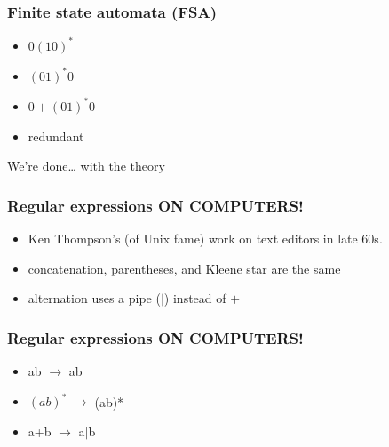 \documentclass[%
        hyperref={%
                pdfauthor={Zakariyya Mughal},%
                pdfpagemode={None},pdfpagelayout={SinglePage}}%
        xcolor={x11names},%
]{beamer}
\begin{document}
\begin{frame}
\frametitle{Finite state automata (FSA)}
\centering\resizebox{0.8\textwidth}{!}{ 
	
}

\begin{itemize}
	\item \(0(10)^*\)
		\pause
	\item \((01)^*0\)
		\pause
	\item \(0+(01)^*0\)
	\item[]	\quad redundant
\end{itemize}
\end{frame}

\begin{frame}
	\begin{center}
	\Huge
	We're done\ldots\newline
	\pause
	with the theory
	\end{center}
\end{frame}

\begin{frame}
	\frametitle{Regular expressions ON COMPUTERS!}
	\begin{itemize}
		\item Ken Thompson's (of Unix fame) work on text
			editors in late 60s.
		\item concatenation, parentheses, and Kleene star are the same
		\item alternation uses a pipe (\(|\)) instead of
			\(+\)
	\end{itemize}
\end{frame}

\begin{frame}
	\frametitle{Regular expressions ON COMPUTERS!}
	\begin{itemize}
		\item  ab \(\rightarrow\) ab
		\item  \((ab)^*\) \(\rightarrow\) (ab)*
		\item  a+b \(\rightarrow\) a\(|\)b
	\end{itemize}
\end{frame}
\end{document}
